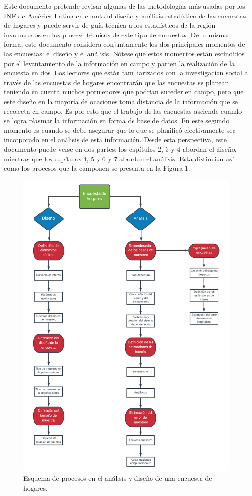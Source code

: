 Este documento pretende revisar algunas de las metodologías más usadas por los INE de América Latina en cuanto al diseño y análisis estadístico de las encuestas de hogares y puede servir de guía técnica a los estadísticos de la región involucrados en los proceso técnicos de este tipo de encuestas. De la misma forma, este documento considera conjuntamente los dos principales momentos de las encuestas: el diseño y el análisis. Nótese que estos momentos están escindidos por el levantamiento de la información en campo y parten la realización de la encuesta en dos. Los lectores que están familiarizados con la investigación social a través de las encuestas de hogares encontrarán que las encuestas se planean teniendo en cuenta muchos pormenores que podrían suceder en campo, pero que este diseño en la mayoría de ocasiones toma distancia de la información que se recolecta en campo. Es por esto que el trabajo de las encuestas asciende cuando se logra plasmar la información en forma de base de datos. En este segundo momento es cuando se debe asegurar que lo que se planificó efectivamente sea incorporado en el análisis de esta información. Desde esta perspectiva, este documento puede verse en dos partes: los capítulos 2, 3 y 4 abordan el diseño, mientras que los capítulos 4, 5 y 6 y 7 abordan el análisis. Esta distinción así como los procesos que la componen se presenta en la Figura 1.

\begin{figure}
\centering
\includegraphics{Pics/1.pdf}
\caption{Esquema de procesos en el análisis y diseño de una encuesta de hogares.}
\end{figure}

